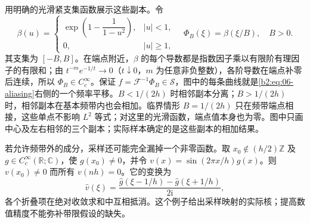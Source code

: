 用明确的光滑紧支集函数展示这些副本。令
\[
 \beta(u)=
 \begin{cases}
 \exp\!\left(1-\dfrac1{1-u^2}\right),&|u|<1,\\
 0,&|u|\geq1,
 \end{cases}
 \quad \Phi_B(\xi)=\beta(\xi/B),\quad B>0.
\]
其支集为 \([-B,B]\)。在端点附近，\(\beta\) 的每个导数都是指数因子乘以有限阶有理因子的有限和；由 \(t^{-m}e^{-1/t}\to0\)（\(t\downarrow0\)，\(m\) 为任意非负整数），各阶导数在端点补零后连续，所以 \(\Phi_B\in C_c^\infty\)。保证 \(f=\mathcal F^{-1}\Phi_B\in\mathcal S\)，图中的每条曲线就是\eqref{b2:eq:06-aliasing}右侧的一个频率平移。\(B<1/(2h)\) 时相邻副本分离；\(B>1/(2h)\) 时，相邻副本在基本频带内也会相加。临界情形 \(B=1/(2h)\) 只在频带端点相接，这些单点不影响 \(L^2\) 等式；对这里的光滑函数，端点值本身也为零。图中只画中心及左右相邻的三个副本；实际样本确定的是这些副本的相加结果。



若允许频带外的成分，采样还可能完全漏掉一个非零函数。取 \(x_0\notin(h/2)\mathbb Z\) 及 \(g\in C_c^\infty(\mathbb R;\mathbb C)\)，使 \(g(x_0)\ne0\)，并令 \(v(x)=\sin(2\pi x/h)g(x)\)。则 \(v(x_0)\ne0\) 而所有 \(v(nh)=0\)。它的变换为
\[
 \widehat v(\xi)=\frac{\widehat g(\xi-1/h)-\widehat g(\xi+1/h)}{2\mathrm{i}},
\]
各个折叠项在绝对收敛求和中互相抵消。这个例子给出采样映射的实际核；提高数值精度不能弥补带限假设的缺失。
